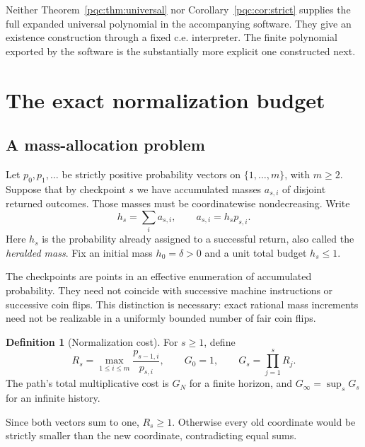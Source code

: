 \documentclass[11pt,letterpaper]{article}
\numberwithin{equation}{section}
\theoremstyle{definition}
\newtheorem{definition}[theorem]{Definition}
\theoremstyle{remark}
\begin{document}
Neither Theorem~\ref{pqc:thm:universal} nor Corollary~\ref{pqc:cor:strict} supplies the
full expanded universal polynomial in the accompanying software. They give
an existence construction through a fixed c.e. interpreter. The finite
polynomial exported by the software is the substantially more explicit one
constructed next.

\section{The exact normalization budget}\label{pqc:sec:budget}

\subsection{A mass-allocation problem}
Let $p_0,p_1,\ldots$ be strictly positive probability vectors on
$\{1,\ldots,m\}$, with $m\ge2$. Suppose that by checkpoint $s$ we have
accumulated masses $a_{s,i}$ of disjoint returned outcomes. Those masses must
be coordinatewise nondecreasing. Write
\begin{equation}\label{pqc:eq:normalization}
 h_s=\sum_i a_{s,i},\qquad a_{s,i}=h_sp_{s,i}.
\end{equation}
Here $h_s$ is the probability already assigned to a successful return, also
called the \emph{heralded mass}. Fix an initial mass $h_0=\delta>0$ and a
unit total budget $h_s\le1$.

The checkpoints are points in an effective enumeration of accumulated
probability. They need not coincide with successive machine instructions or
successive coin flips. This distinction is necessary: exact rational mass
increments need not be realizable in a uniformly bounded number of fair
coin flips.

\begin{definition}[Normalization cost]
For $s\ge1$, define
\begin{equation}\label{pqc:eq:R-G}
 R_s=\max_{1\le i\le m}\frac{p_{s-1,i}}{p_{s,i}},\qquad
 G_0=1,\qquad G_s=\prod_{j=1}^{s}R_j.
\end{equation}
The path's total multiplicative cost is $G_N$ for a finite horizon, and
$G_\infty=\sup_sG_s$ for an infinite history.
\end{definition}

Since both vectors sum to one, $R_s\ge1$. Otherwise every old coordinate
would be strictly smaller than the new coordinate, contradicting equal
sums.
\end{document}
